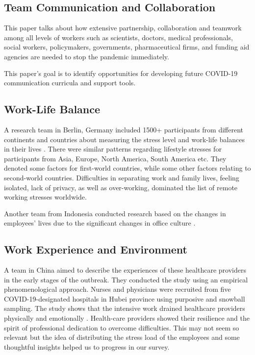 \documentclass[11pt]{article}
\begin{document}
\subsection {Team Communication and Collaboration}
This paper \cite{nafis1} talks about how extensive partnership, collaboration and teamwork among all levels of workers such as scientists, doctors, medical professionals, social workers, policymakers, governments, pharmaceutical firms, and funding aid agencies are needed to stop the pandemic immediately. 

This paper’s \cite{nafis2} goal is to identify opportunities for developing future COVID-19 communication curricula and support tools.
\subsection {Work-Life Balance}
A research team in Berlin, Germany included 1500+ participants from different continents and countries about measuring the stress level and work-life balances in their lives \cite{mishra1}. There were similar patterns regarding lifestyle stresses for participants from Asia, Europe, North America, South America etc. They denoted some factors for first-world countries, while some other factors relating to second-world countries. Difficulties in separating work and family lives, feeling isolated, lack of privacy, as well as over-working, dominated the list of remote working stresses worldwide.

Another team from Indonesia conducted research based on the changes in employees’ lives due to the significant changes in office culture \cite{mishra2}.

\subsection {Work Experience and Environment}
A team in China aimed to describe the experiences of these healthcare providers in the early stages of the outbreak. They conducted the study using an empirical phenomenological approach. Nurses and physicians were recruited from five COVID-19-designated hospitals in Hubei province using purposive and snowball sampling. The study shows that the intensive work drained healthcare providers physically and emotionally \cite{afra1}. Health-care providers showed their resilience and the spirit of professional dedication to overcome difficulties. This may not seem so relevant but the idea of distributing the stress load of the employees and some thoughtful insights helped us to progress in our survey. 
\end{document}
